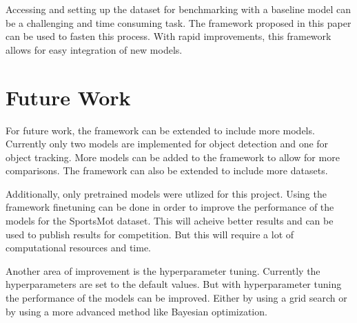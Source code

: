 \documentclass[runningheads]{llncs}
\begin{document}
Accessing and setting up the dataset for benchmarking with a baseline model can be a challenging and time consuming task.
The framework proposed in this paper can be used to fasten this process.
With rapid improvements, this framework allows for easy integration of new models.

\section{Future Work}
For future work, the framework can be extended to include more models.
Currently only two models are implemented for object detection and one for object tracking.
More models can be added to the framework to allow for more comparisons.
The framework can also be extended to include more datasets.

Additionally, only pretrained models were utlized for this project.
Using the framework finetuning can be done in order to improve the performance of the models for the SportsMot dataset.
This will acheive better results and can be used to publish results for competition.
But this will require a lot of computational resources and time.

Another area of improvement is the hyperparameter tuning.
Currently the hyperparameters are set to the default values.
But with hyperparameter tuning the performance of the models can be improved.
Either by using a grid search or by using a more advanced method like Bayesian optimization.

%
%


\nocite{*}
\end{document}
